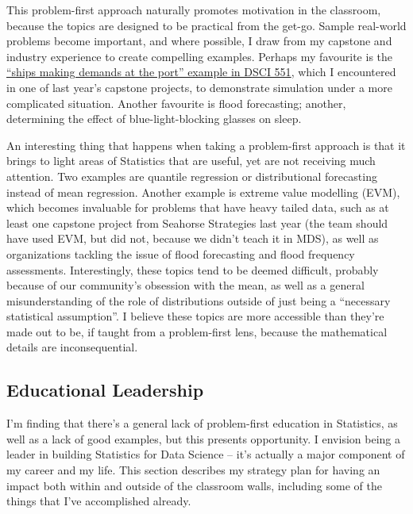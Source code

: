 \documentclass[]{article}
\begin{document}
This problem-first approach naturally promotes motivation in the classroom, because the topics are designed to be practical from the get-go. Sample real-world problems become important, and where possible, I draw from my capstone and industry experience to create compelling examples. Perhaps my favourite is the \href{https://ubc-mds.github.io/DSCI_551_stat-prob-dsci/lectures/simulation.html\#multi-step-simulations-10-min}{``ships making demands at the port'' example in DSCI 551}, which I encountered in one of last year's capstone projects, to demonstrate simulation under a more complicated situation. Another favourite is flood forecasting; another, determining the effect of blue-light-blocking glasses on sleep.

An interesting thing that happens when taking a problem-first approach is that it brings to light areas of Statistics that are useful, yet are not receiving much attention. Two examples are quantile regression or distributional forecasting instead of mean regression. Another example is extreme value modelling (EVM), which becomes invaluable for problems that have heavy tailed data, such as at least one capstone project from Seahorse Strategies last year (the team should have used EVM, but did not, because we didn't teach it in MDS), as well as organizations tackling the issue of flood forecasting and flood frequency assessments. Interestingly, these topics tend to be deemed difficult, probably because of our community's obsession with the mean, as well as a general misunderstanding of the role of distributions outside of just being a ``necessary statistical assumption''. I believe these topics are more accessible than they're made out to be, if taught from a problem-first lens, because the mathematical details are inconsequential.

\hypertarget{educational-leadership}{%
\subsection{Educational Leadership}\label{educational-leadership}}

I'm finding that there's a general lack of problem-first education in Statistics, as well as a lack of good examples, but this presents opportunity. I envision being a leader in building Statistics for Data Science -- it's actually a major component of my career and my life. This section describes my strategy plan for having an impact both within and outside of the classroom walls, including some of the things that I've accomplished already.
\end{document}
